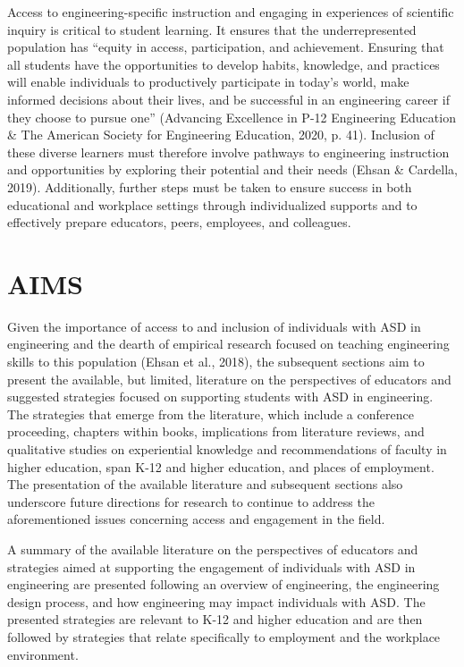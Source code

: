 \documentclass[11.5pt]{sig-alternate}
\begin{document}
\begin{large}
Access to engineering-specific instruction and engaging in experiences of scientific inquiry is critical to student learning. It ensures that the underrepresented population has “equity in access, participation, and achievement. Ensuring that all students have the opportunities to develop habits, knowledge, and practices will enable individuals to productively participate in today’s world, make informed decisions about their lives, and be successful in an engineering career if they choose to pursue one” (Advancing Excellence in P-12 Engineering Education \& The American Society for Engineering Education, 2020, p. 41). Inclusion of these diverse learners must therefore involve pathways to engineering instruction and opportunities by exploring their potential and their needs (Ehsan \& Cardella, 2019). Additionally, further steps must be taken to ensure success in both educational and workplace settings through individualized supports and to effectively prepare educators, peers, employees, and colleagues. 

\section*{AIMS}

Given the importance of access to and inclusion of individuals with ASD in engineering and the dearth of empirical research focused on teaching engineering skills to this population (Ehsan et al., 2018), the subsequent sections aim to present the available, but limited, literature on the perspectives of educators and suggested strategies focused on supporting students with ASD in engineering. The strategies that emerge from the literature, which include a conference proceeding, chapters within books, implications from literature reviews, and qualitative studies on experiential knowledge and recommendations of faculty in higher education, span K-12 and higher education, and places of employment. The presentation of the available literature and subsequent sections also underscore future directions for research to continue to address the aforementioned issues concerning access and engagement in the field.

A summary of the available literature on the perspectives of educators and strategies aimed at supporting the engagement of individuals with ASD in engineering are presented following an overview of engineering, the engineering design process, and how engineering may impact individuals with ASD. The presented strategies are relevant to K-12 and higher education and are then followed by strategies that relate specifically to employment and the workplace environment.


\end{large}
\end{document}
